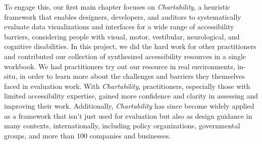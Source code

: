\documentclass[12pt]{cmuthesis}
\begin{document}



To engage this, our first main chapter focuses on \textit{Chartability}, a heuristic framework that enables designers, developers, and auditors to systematically evaluate data visualizations and interfaces for a wide range of accessibility barriers, considering people with visual, motor, vestibular, neurological, and cognitive disabilities. In this project, we did the hard work for other practitioners and contributed our collection of synthesized accessibility resources in a single workbook. We had practitioners try out our resource in real environments, in-situ, in order to learn more about the challenges and barriers they themselves faced in evaluation work. With \textit{Chartability}, practitioners, especially those with limited accessibility expertise, gained more confidence and clarity in assessing and improving their work. Additionally, \textit{Chartability} has since become widely applied as a framework that isn't just used for evaluation but also as design guidance in many contexts, internationally, including policy organizations, governmental groups, and more than 100 companies and businesses.
\end{document}
